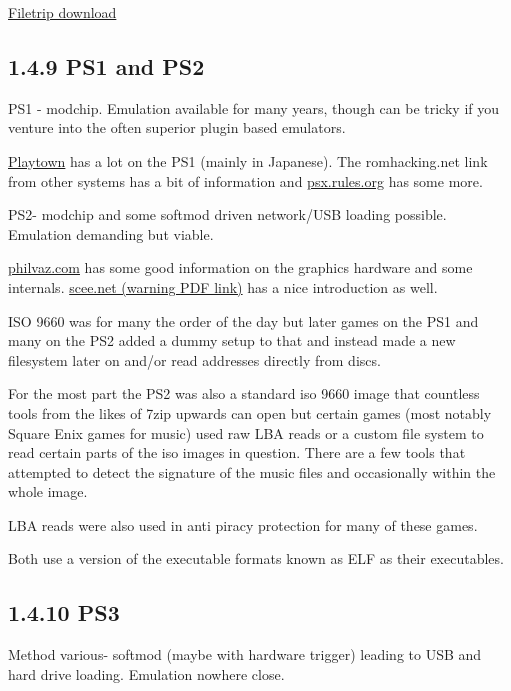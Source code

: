 \documentclass[
]{book}
\begin{document}
\href{http://filetrip.net/360-downloads/hdd-tools/download-usb-xtaf-xplorer-44-f23780.html}{Filetrip download}

\hypertarget{ps1-and-ps2}{%
\subsection{1.4.9 PS1 and PS2}\label{ps1-and-ps2}}

PS1 - modchip. Emulation available for many years, though can be tricky if you venture into the often superior plugin based emulators.

\href{http://www.geocities.co.jp/Playtown/2004/psx/}{Playtown} has a lot on the PS1 (mainly in Japanese). The romhacking.net link from other systems has a bit of information and \href{http://psx.rules.org/psxrul2.shtml}{psx.rules.org} has some more.

PS2- modchip and some softmod driven network/USB loading possible. Emulation demanding but viable.

\href{http://www.philvaz.com/games/PS2.htm}{philvaz.com} has some good information on the graphics hardware and some internals. \href{http://research.scee.net/files/presentations/agdc2002/PS2forPCprogrammers.pdf}{scee.net (warning PDF link)} has a nice introduction as well.

ISO 9660 was for many the order of the day but later games on the PS1 and many on the PS2 added a dummy setup to that and instead made a new filesystem later on and/or read addresses directly from discs.

For the most part the PS2 was also a standard iso 9660 image that countless tools from the likes of 7zip upwards can open but certain games (most notably Square Enix games for music) used raw LBA reads or a custom file system to read certain parts of the iso images in question. There are a few tools that attempted to detect the signature of the music files and occasionally within the whole image.

LBA reads were also used in anti piracy protection for many of these games.

Both use a version of the executable formats known as ELF as their executables.

\hypertarget{ps3}{%
\subsection{1.4.10 PS3}\label{ps3}}

Method various- softmod (maybe with hardware trigger) leading to USB and hard drive loading. Emulation nowhere close.
\end{document}
